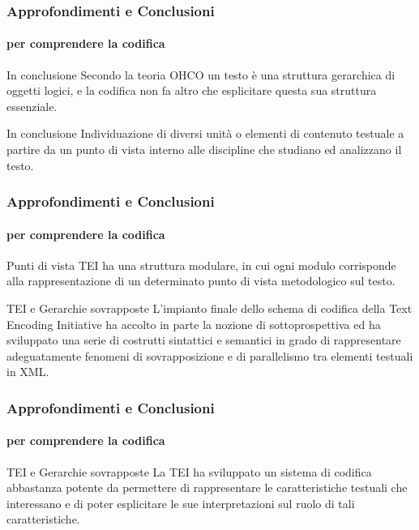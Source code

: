 \begin{frame}
	\frametitle{Approfondimenti e Conclusioni}
	\framesubtitle{per comprendere la codifica}
	\addtocounter{nframe}{1}

	\begin{block}{In conclusione}
		Secondo la teoria OHCO un testo è una struttura gerarchica di oggetti logici, e la codifica non fa altro che esplicitare questa sua struttura essenziale.
     \end{block}
     
     \begin{block}{In conclusione}
		Individuazione di diversi unità o elementi di contenuto testuale a partire da un punto di vista interno alle discipline che studiano ed analizzano il testo.
	 \end{block}
   
\end{frame}


\begin{frame}
	\frametitle{Approfondimenti e Conclusioni}
	\framesubtitle{per comprendere la codifica}
	\addtocounter{nframe}{1}

	\begin{block}{Punti di vista}
		 TEI ha una struttura modulare, in cui ogni modulo corrisponde alla rappresentazione di un determinato punto di vista metodologico sul testo.
     \end{block}
     
     \begin{block}{TEI e Gerarchie sovrapposte}
		L’impianto finale dello schema di codifica della Text Encoding Initiative ha accolto in parte la nozione di sottoprospettiva ed ha sviluppato una serie di costrutti sintattici e semantici in grado di rappresentare adeguatamente fenomeni di sovrapposizione e di parallelismo tra elementi testuali in XML.
	 \end{block}
	 
   
\end{frame}

\begin{frame}
	\frametitle{Approfondimenti e Conclusioni}
	\framesubtitle{per comprendere la codifica}
	\addtocounter{nframe}{1}
     
     \begin{block}{TEI e Gerarchie sovrapposte}
		La TEI ha sviluppato un sistema di codifica abbastanza potente da permettere di rappresentare le caratteristiche testuali che interessano e di poter esplicitare le sue interpretazioni sul ruolo di tali caratteristiche.
	 \end{block}

\end{frame}

